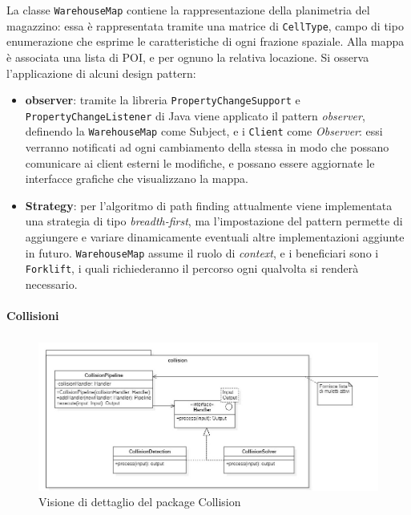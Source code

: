La classe \texttt{WarehouseMap} contiene la rappresentazione della planimetria del magazzino: essa è rappresentata tramite una matrice di \texttt{CellType}, campo di tipo enumerazione che esprime le caratteristiche di ogni frazione spaziale. Alla mappa è associata una lista di POI, e per ognuno la relativa locazione. 
Si osserva l'applicazione di alcuni design pattern:
\begin{itemize}
	\item \textbf{observer}: tramite la libreria \texttt{PropertyChangeSupport} e \texttt{PropertyChangeListener} di Java viene applicato il pattern \textit{observer}, definendo la \texttt{WarehouseMap} come Subject, e i \texttt{Client} come \textit{Observer}: essi verranno notificati ad ogni cambiamento della stessa in modo che possano comunicare ai client esterni le modifiche, e possano essere aggiornate le interfacce grafiche che visualizzano la mappa.
	\item \textbf{Strategy}: per l’algoritmo di path finding attualmente viene implementata una strategia di tipo \textit{breadth-first}, ma l’impostazione del pattern permette di aggiungere e variare dinamicamente eventuali altre implementazioni aggiunte in futuro. \texttt{WarehouseMap} assume il ruolo di \textit{context}, e i beneficiari sono i \texttt{Forklift}, i quali richiederanno il percorso ogni qualvolta si renderà necessario.
\end{itemize}





\paragraph{Collisioni}
\subparagraph*{ }

\begin{figure}[H]
	\centering
	\includegraphics[scale=0.50]{res/diagrams/server/server_pack_collision.jpg}
	\caption{Visione di dettaglio del package Collision}
\end{figure}


